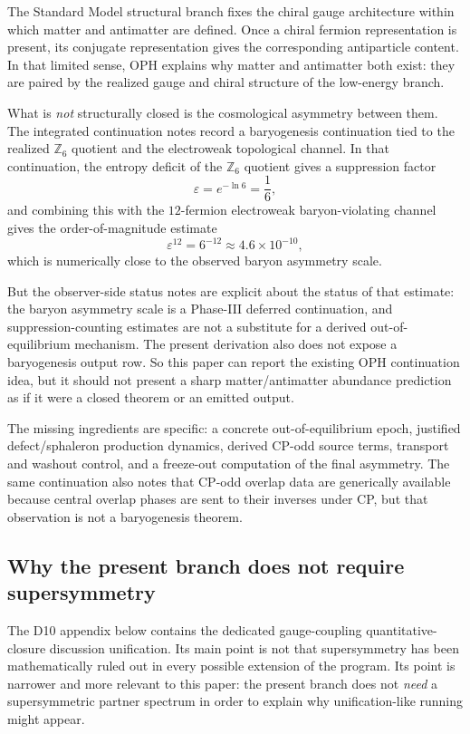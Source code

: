 \documentclass[11pt]{article}
\begin{document}
The Standard Model structural branch fixes the chiral gauge architecture within which
matter and antimatter are defined. Once a chiral fermion representation is present, its conjugate
representation gives the corresponding antiparticle content. In that limited sense, OPH explains
why matter and antimatter both exist: they are paired by the realized gauge and chiral structure
of the low-energy branch.

What is \emph{not} structurally closed is the cosmological asymmetry between them. The
integrated continuation notes record a baryogenesis continuation tied to the realized
\(\mathbb Z_6\) quotient and the electroweak topological channel. In that continuation, the
entropy deficit of the \(\mathbb Z_6\) quotient gives a suppression factor
\[
\varepsilon = e^{-\ln 6} = \frac{1}{6},
\]
and combining this with the \(12\)-fermion electroweak baryon-violating channel gives the
order-of-magnitude estimate
\[
\varepsilon^{12}=6^{-12}\approx 4.6\times 10^{-10},
\]
which is numerically close to the observed baryon asymmetry scale.

But the observer-side status notes are explicit about the status of that estimate: the baryon
asymmetry scale is a Phase-III deferred continuation, and suppression-counting estimates are
not a substitute for a derived out-of-equilibrium mechanism. The present derivation
also does not expose a baryogenesis output row. So this paper can report the
existing OPH continuation idea, but it should not present a sharp matter/antimatter abundance
prediction as if it were a closed theorem or an emitted output.

The missing ingredients are specific: a concrete out-of-equilibrium epoch, justified
defect/sphaleron production dynamics, derived CP-odd source terms, transport and washout control,
and a freeze-out computation of the final asymmetry. The same continuation also notes that CP-odd
overlap data are generically available because central overlap phases are sent to their inverses
under CP, but that observation is not a baryogenesis theorem.

\subsection{Why the present branch does not require supersymmetry}

The D10 appendix below contains the dedicated gauge-coupling quantitative-closure discussion
unification. Its main point is not that supersymmetry has been mathematically ruled out in every
possible extension of the program. Its point is narrower and more relevant to this paper: the present
branch does not \emph{need} a supersymmetric partner spectrum in order to explain why
unification-like running might appear.
\end{document}
